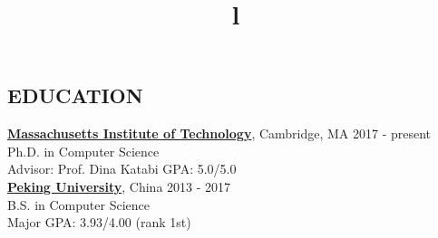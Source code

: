 \documentclass[margin]{res}
\newcommand{\Bullet}[1]{{\raisebox{0.25ex}{\tiny$\bullet$\ }}{#1}\\}
\begin{document}


\address{ \href{mailto:haohe@mit.edu}{haohe@mit.edu} $\mid$ {+1\ 640-840-0491} }


\begin{resume}

\section{EDUCATION}
\href{http://web.mit.edu}{\textbf{Massachusetts Institute of Technology}}, Cambridge, MA
\hfill 2017 - present
\\
Ph.D. in Computer Science
\\
\Bullet{Advisor: Prof. Dina Katabi    \qquad GPA: 5.0/5.0}
\href{http://english.pku.edu.cn/}{\textbf{Peking University}}, China
\hfill 2013 - 2017
\\
B.S. in Computer Science
\\
\Bullet{Major GPA: 3.93/4.00 (rank 1st)}
\vspace{-15mm}

\begin{format}
\title{l} \hfill {}\\
\body\\
\end{format}


\end{resume}
\end{document}
